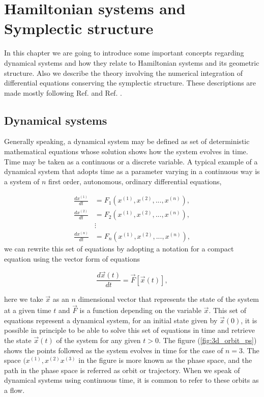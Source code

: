 \pagestyle{fancy}
\fancyhf{}
\rhead{\rightmark}
\lhead{\thepage}

\chapter{Hamiltonian systems and Symplectic structure}
In this chapter we are going to introduce some important concepts regarding dynamical systems and how they relate to Hamiltonian systems and its geometric structure. Also we describe the theory involving the numerical integration of differential equations conserving the symplectic structure. These descriptions are made mostly following Ref. \cite{ott_chaos_2002} and Ref. \cite{sanz2018numerical}.





\section{Dynamical systems}
Generally speaking, a dynamical system may be defined as set of deterministic mathematical equations whose solution shows how the system evolves in time. Time may be taken as a continuous or a discrete variable. A typical example of a dynamical system that adopts time as a parameter varying in  a continuous way is a system of $n$ first order, autonomous, ordinary differential equations,

\begin{eqnarray} 
\frac{dx^{(1)}}{dt}&=F_1(x^{(1)},x^{(2)},...,x^{(n)}),\nonumber \\
\frac{dx^{(2)}}{dt}&=F_2(x^{(1)},x^{(2)},...,x^{(n)}),\\
&\vdots \nonumber \\
\frac{dx^{(n)}}{dt}&=F_n(x^{(1)},x^{(2)},...,x^{(n)}),
\nonumber
\label{eq:set_diff_eqs}
\end{eqnarray} 
we can rewrite this set of equations by adopting a notation for a compact equation using the vector form of equations

\begin{equation}
\frac{d\vec{x}(t)}{dt}=\vec{F}[\vec{x}(t)],
\label{eq_:vect_diff_eqs}
\end{equation}

here we take $\vec{x}$ as an $n$ dimensional vector that represents the state of the system at a given time $t$ and $\vec{F}$ is a function depending on the variable $\vec{x}$. This set of equations represent a dynamical system, for an initial state given by $\vec{x}(0)$, it is possible in principle to be able to solve this set of equations in time and retrieve the state $\vec{x}(t)$ of the system for any given $t>0$. The figure (\ref{fig:3d_orbit_ps}) shows the points followed as the system evolves in time for the case of $n=3$. The space $(x^{(1)},x^{(2)}x^{(3)}$ in the figure is more known as the phase space, and the path in the phase space is referred as orbit or trajectory. When we speak of dynamical systems using continuous time, it is common to refer to these orbits as a flow.

